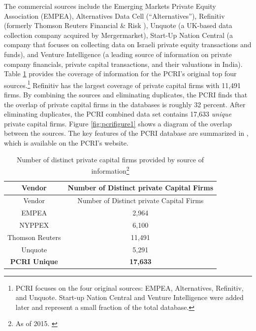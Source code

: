 \documentclass[
]{WileySix}
\begin{document}
The commercial sources include the Emerging Markets Private Equity Association (EMPEA), Alternatives Data Cell (``Alternatives''), Refinitiv (formerly Thomson Reuters Financial \& Risk ), Unquote (a UK-based data collection company acquired by Mergermarket), Start-Up Nation Central (a company that focuses on collecting data on Israeli private equity transactions and funds), and Venture Intelligence (a leading source of information on private company financials, private capital transactions, and their valuations in India). Table \ref{tab:pcritable1} provides the coverage of information for the PCRI's original top four sources.\footnote{PCRI focuses on the four original sources: EMPEA, Alternatives, Refinitiv, and Unquote. Start-up Nation Central and Venture Intelligence were added later and represent a small fraction of the total database.} Refinitiv has the largest coverage of private capital firms with 11,491 firms. By combining the sources and eliminating duplicates, the PCRI finds that the overlap of private capital firms in the databases is roughly 32 percent. After eliminating duplicates, the PCRI combined data set contains 17,633 \emph{unique} private capital firms. Figure \ref{fig:pcrifigure1} shows a diagram of the overlap between the sources. The key features of the PCRI database are summarized in \citep{jeng2015}, which is available on the PCRI's website.

\begin{longtable}[]{@{}cc@{}}
\caption[\label{tab:pcritable1} Number of distinct private capital firms provided by source of information]{\label{tab:pcritable1} Number of distinct private capital firms provided by source of information\footnote{As of 2015. \citep{jeng2015}}}\tabularnewline
\toprule
Vendor & Number of Distinct private Capital Firms\tabularnewline
\midrule
\endfirsthead
\toprule
Vendor & Number of Distinct private Capital Firms\tabularnewline
\midrule
\endhead
EMPEA & 2,964\tabularnewline
NYPPEX & 6,100\tabularnewline
Thomson Reuters & 11,491\tabularnewline
Unquote & 5,291\tabularnewline
\textbf{PCRI Unique} & \textbf{17,633}\tabularnewline
\bottomrule
\end{longtable}
\end{document}
